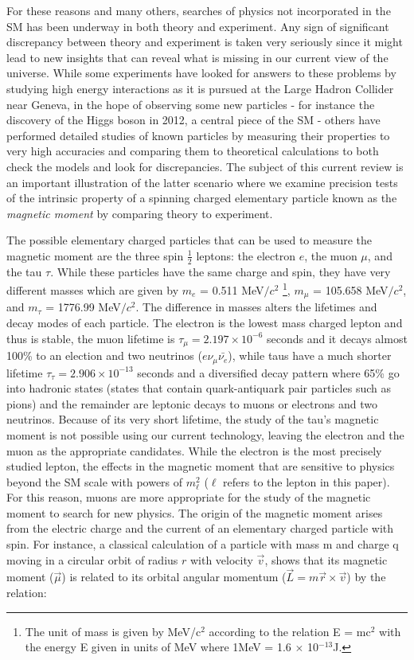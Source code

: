 \documentclass{outhesis}
\begin{document}
For these reasons and many others, searches of physics not incorporated in the SM has been underway in both theory and experiment. Any sign of significant discrepancy between theory and experiment is taken very seriously since it might lead to new insights that can reveal what is missing in our current view of the universe. While some experiments have looked for answers to these problems by studying high energy interactions as it is pursued at the Large Hadron Collider near Geneva, in the hope of observing some new particles - for instance the discovery of the Higgs boson in 2012, a central piece of the SM - others have performed detailed studies of known particles by measuring their properties to very high accuracies and comparing them to theoretical calculations to both check the models and look for discrepancies. The subject of this current review is an important illustration of the latter scenario where we examine precision tests of the intrinsic property of a spinning charged elementary particle known as the \emph{magnetic moment} by comparing theory to experiment.

The possible elementary charged particles that can be used to measure the magnetic moment are the three spin $\frac{1}{2}$ leptons: the electron $e$, the muon $\mu$, and the tau $\tau$. While these particles have the same charge and spin, they have very different masses which are given by $m_e$ = 0.511 MeV$/c^2$ \footnote{The unit of mass is given by MeV/c$^2$ according to the relation E = mc$^2$ with the energy E given in units of MeV where 1MeV = 1.6 $\times$ 10$^{-13}$J.}, $m_{\mu}$ = 105.658 MeV$/c^2$, and $m_{\tau}$ = 1776.99 MeV$/c^2$. The difference in masses alters the lifetimes and decay modes of each particle. The electron is the lowest mass charged lepton and thus is stable, the muon lifetime is $\tau_{\mu} = 2.197 \times 10^{-6}$ seconds and it decays almost 100\% to an election and two neutrinos ($e\nu_{\mu}\bar{\nu_{e}}$), while taus have a much shorter lifetime $\tau_{\tau} = 2.906 \times 10^{-13}$ seconds and a diversified decay pattern where 65\% go into hadronic states (states that contain quark-antiquark pair particles such as pions) and the remainder are leptonic decays to muons or electrons and two neutrinos. Because of its very short lifetime, the study of the tau's magnetic moment is not possible using our current technology, leaving the electron and the muon as the appropriate candidates. While the electron is the most precisely studied lepton, the effects in the magnetic moment that are sensitive to physics beyond the SM scale with powers of $m_\ell^2$ ($\ell$ refers to the lepton in this paper). For this reason, muons are more appropriate for the study of the magnetic moment to search for new physics. 
The origin of the magnetic moment arises from the electric charge and the current of an elementary charged particle with spin. For instance, a classical calculation of a particle with mass m and charge q moving in a circular orbit of radius $r$ with velocity $\overrightarrow{v}$, shows that its magnetic moment ($\overrightarrow{\mu}$) is related to its orbital angular momentum ($\overrightarrow{L} =m\overrightarrow{r} \times \overrightarrow{v}$) by the relation:
\end{document}
